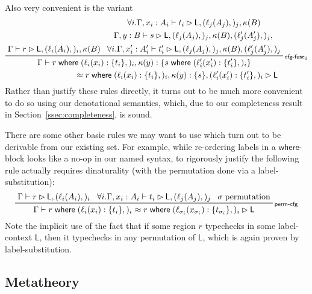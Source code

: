 \documentclass[acmsmall,screen,review]{acmart}
\newcommand{\ms}[1]{\ensuremath{\mathsf{#1}}}
\newcommand{\lto}{:}
\newcommand{\where}[2]{#1\;\ms{where}\;#2}
\newcommand{\wbranch}[3]{#1(#2) \lto \{#3\}}
\newcommand{\bhyp}[2]{#1 : #2}
\newcommand{\lhyp}[2]{#1(#2)}
\newcommand{\rle}[1]{{\scriptsize\textsf{#1}}}
\newcommand{\haslb}[3]{#1 \vdash #2 \rhd #3}
\newcommand{\teqv}{\approx}
\newcommand{\lbeq}[4]{#1 \vdash #2 \teqv #3 \rhd {#4}}
\begin{document}
Also very convenient is the variant
\begin{equation}
  \prftree[r]{\rle{cfg-fuse$_2$}}
    {\haslb{\Gamma}{r}{\ms{L}, (\lhyp{\ell_i}{A_i},)_i, \kappa(B)}}
    {
      \prfStackPremises{
        \forall i. \haslb{\Gamma, \bhyp{x_i}{A_i}}{t_i}{
          \ms{L}, (\lhyp{\ell_j}{A_j},)_j, \kappa(B)}
      }{
        \haslb{\Gamma, \bhyp{y}{B}}{s}{
          \ms{L}, (\lhyp{\ell_j}{A_j},)_j, \kappa(B), (\lhyp{\ell_j'}{A_j'},)_j,}
      }{
        \forall i. \haslb{\Gamma, \bhyp{x_i'}{A_i'}}{t_i'}{
          \ms{L}, (\lhyp{\ell_j}{A_j},)_j, \kappa(B), (\lhyp{\ell_j'}{A_j'},)_j}
      }
    }
    {
      \prfStackPremises{
        \Gamma \vdash 
          \where{r}{(\wbranch{\ell_i}{x_i}{t_i},)_i, 
            \wbranch{\kappa}{y}{\where{s}{(\wbranch{\ell_i'}{x_i'}{t_i'},)_i}}}
      }{
        \hspace{8em}
        \teqv \where{r}{(\wbranch{\ell_i}{x_i}{t_i},)_i, 
            \wbranch{\kappa}{y}{s}, (\wbranch{\ell_i'}{x_i'}{t_i'},)_i}
        \rhd \ms{L}
      }
    }
\end{equation}
Rather than justify these rules directly, it turns out to be much more convenient to do so using our
denotational semantics, which, due to our completeness result in Section~\ref{ssec:completeness}, is
sound.

There are some other basic rules we may want to use which turn out to be
derivable from our existing set. For example, while re-ordering labels in a \ms{where}-block looks
like a no-op in our named syntax, to rigorously justify the following rule actually requires
dinaturality (with the permutation done via a label-substitution):
\begin{equation}
  \prftree[r]{\rle{perm-cfg}}
    {\haslb{\Gamma}{r}{\ms{L}, (\lhyp{\ell_i}{A_i},)_i}}
    {\forall i. \haslb{\Gamma, \bhyp{x_i}{A_i}}{t_i}{\ms{L}, (\lhyp{\ell_j}{A_j},)_j}}
    {\sigma\;\text{permutation}}
    {\lbeq{\Gamma}
      {\where{r}{(\wbranch{\ell_i}{x_i}{t_i},)_i}}
      {\where{r}{(\wbranch{\ell_{\sigma_i}}{x_{\sigma_i}}{t_{\sigma_i}},)_i}}{\ms{L}}}
\end{equation}
Note the implicit use of the fact that if some region $r$ typechecks in some label-context $\ms{L}$,
then it typechecks in any permutation of $\ms{L}$, which is again proven by label-substitution.

\subsection{Metatheory}
\end{document}
